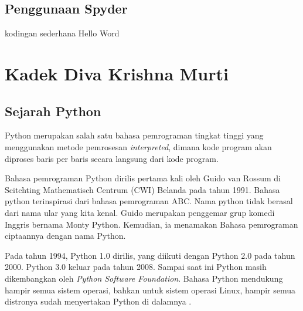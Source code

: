 \subsection{Penggunaan Spyder}
kodingan sederhana Hello Word 


\section{Kadek Diva Krishna Murti}

\subsection{Sejarah Python}
Python merupakan salah satu bahasa pemrograman tingkat tinggi yang menggunakan metode pemrosesan \textit{interpreted}, dimana kode program akan diproses baris per baris secara langsung dari kode program.

Bahasa pemrograman Python dirilis pertama kali oleh Guido van Rossum di Scitchting Mathematisch Centrum (CWI) Belanda pada tahun 1991. Bahasa python terinspirasi dari bahasa pemrograman ABC. Nama python tidak berasal dari nama ular yang kita kenal. Guido merupakan penggemar grup komedi Inggris bernama Monty Python. Kemudian, ia menamakan Bahasa pemrograman ciptaannya dengan nama Python.

Pada tahun 1994, Python 1.0 dirilis, yang diikuti dengan Python 2.0 pada tahun 2000. Python 3.0 keluar pada tahun 2008. Sampai saat ini Python masih dikembangkan oleh \textit{Python Software Foundation}. Bahasa Python mendukung hampir semua sistem operasi, bahkan untuk sistem operasi Linux, hampir semua distronya sudah menyertakan Python di dalamnya \cite{roihan2017monitoring}.


